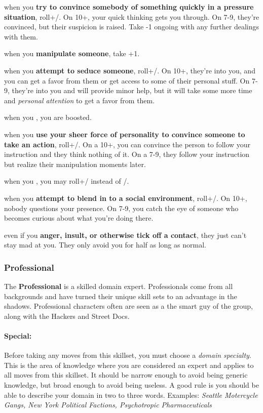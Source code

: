\documentclass[oneside,10pt]{article}
\begin{document}
\begin{multicols}{2}
 when you \textbf{try to convince somebody of
  something quickly in a pressure situation}, roll+\flair/. On 10+,
your quick thinking gets you through. On 7-9, they’re convinced, but
their suspicion is raised. Take -1 ongoing with any further dealings
with them.

 when you \textbf{manipulate someone}, take +1.

 when you \textbf{attempt to seduce someone},
roll+\flair/. On 10+, they’re into you, and you can get a favor from
them or get access to some of their personal stuff.  On 7-9, they’re
into you and will provide minor help, but it will take some more time
and \textit{personal attention} to get a favor from them.

 when you , you are boosted.

 when you \textbf{use your sheer force of
  personality to convince someone to take an action}, roll+\flair/. On
a 10+, you can convince the person to follow your instruction and they
think nothing of it. On a 7-9, they follow your instruction but
realize their manipulation moments later. 

 when you , you may
roll+\flair/ instead of \oomph/.

 when you \textbf{attempt to blend in to a social
  environment}, roll+\flair/. On 10+, nobody questions your
presence. On 7-9, you catch the eye of someone who becomes curious
about what you’re doing there.

 even if you \textbf{anger, insult, or
  otherwise tick off a contact}, they just can’t stay mad at you. They
only avoid you for half as long as normal.



\subsubsection{Professional}

The \textbf{Professional} is a skilled domain expert. Professionals
come from all backgrounds and have turned their unique skill sets to
an advantage in the shadows. Professional characters often are seen as
a the smart guy of the group, along with the Hackers and Street Docs.

\paragraph{Special:}
Before taking any moves from this skillset, you must choose a
\textit{domain specialty}. This is the area of knowledge where you are
considered an expert and applies to all moves from this skillset. It
should be narrow enough to avoid being generic knowledge, but broad
enough to avoid being useless. A good rule is you should be able to
describe your domain in two to three words.  Examples: \textit{Seattle
  Motercycle Gangs, New York Political Factions, Psychotropic
  Pharmaceuticals}


\end{multicols}
\end{document}
